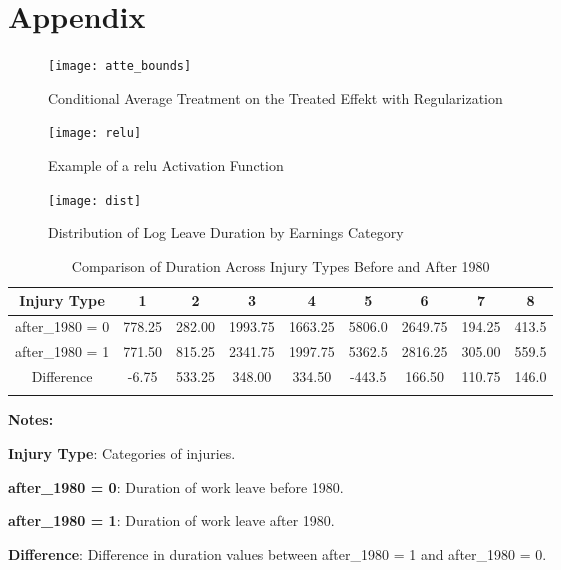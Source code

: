 \section*{Appendix}


\begin{figure}[h]
\centering
\caption{Conditional Average Treatment on the Treated Effekt with Regularization}
\texttt{[image: atte\_bounds]}
\label{fig:atte_bounds}
\end{figure}


\begin{figure}[h]
\centering
\caption{Example of a \ac{relu} Activation Function}
\texttt{[image: relu]}
\label{fig:relu}
\end{figure}

\begin{figure}[h]
\centering
\caption{Distribution of Log Leave Duration by Earnings Category}
\texttt{[image: dist]}
\label{fig:log_duration_distribution}
\end{figure}

\begin{table}[ht]
\centering
\caption{Comparison of Duration Across Injury Types Before and After 1980}
\label{tab:duration}
\begin{threeparttable}
\begin{tabular}{ccccccccc}
Injury Type & \textbf{1} & \textbf{2} & \textbf{3} & \textbf{4} & \textbf{5} & \textbf{6} & \textbf{7} & \textbf{8} \\
\hline
\hline
\addlinespace
after\_1980 = 0 & 778.25 & 282.00 & 1993.75 & 1663.25 & 5806.0 & 2649.75 & 194.25 & 413.5 \\
after\_1980 = 1 & 771.50 & 815.25 & 2341.75 & 1997.75 & 5362.5 & 2816.25 & 305.00 & 559.5 \\
Difference & -6.75 & 533.25 & 348.00 & 334.50 & -443.5 & 166.50 & 110.75 & 146.0 \\ \addlinespace
\end{tabular}
\begin{tablenotes}
\small
\item \textbf{Notes:}
\item \textbf{Injury Type}: Categories of injuries.
\item \textbf{after\_1980 = 0}: Duration of work leave before 1980.
\item \textbf{after\_1980 = 1}: Duration of work leave  after 1980.
\item \textbf{Difference}: Difference in duration values between after\_1980 = 1 and after\_1980 = 0.
\end{tablenotes}
\end{threeparttable}
\end{table}


